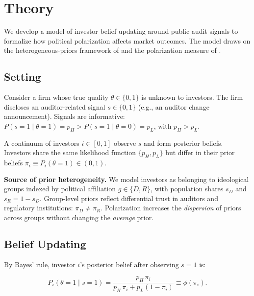 
\section{Theory}
\label{sec:theory}

We develop a model of investor belief updating around public audit signals to
formalize how political polarization affects market outcomes. The model draws on
the heterogeneous-priors framework of \citet{kandel1995} and the polarization
measure of \citet{esteban1994}.

\subsection{Setting}

Consider a firm whose true quality $\theta \in \{0, 1\}$ is unknown to
investors. The firm discloses an auditor-related signal $s \in \{0, 1\}$ (e.g.,
an auditor change announcement). Signals are informative: $P(s=1 \mid
\theta=1) = p_H > P(s=1 \mid \theta=0) = p_L$, with $p_H > p_L$.

A continuum of investors $i \in [0,1]$ observe $s$ and form posterior beliefs.
Investors share the same likelihood function $\{p_H, p_L\}$ but differ in their
prior beliefs $\pi_i \equiv P_i(\theta = 1) \in (0,1)$.

\textbf{Source of prior heterogeneity.} We model investors as belonging to
ideological groups indexed by political affiliation $g \in \{D, R\}$, with
population shares $s_D$ and $s_R = 1 - s_D$. Group-level priors reflect
differential trust in auditors and regulatory institutions:
$\pi_D \neq \pi_R$. Polarization increases the \emph{dispersion} of priors
across groups without changing the \emph{average} prior.

\subsection{Belief Updating}

By Bayes' rule, investor $i$'s posterior belief after observing $s=1$ is:

\begin{equation}
    \label{eq:bayes}
    P_i(\theta = 1 \mid s = 1)
    = \frac{p_H \, \pi_i}{p_H \, \pi_i + p_L (1 - \pi_i)}
    \equiv \phi(\pi_i).
\end{equation}

